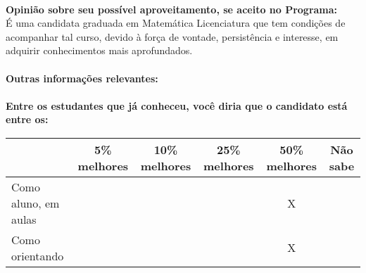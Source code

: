\documentclass[11pt]{article}
\begin{document}
\\
\textbf{Opinião sobre seu possível aproveitamento, se aceito no Programa:}
\\É uma candidata graduada em Matemática Licenciatura que tem condições de acompanhar tal curso, devido à força de vontade, persistência e interesse, em adquirir conhecimentos mais aprofundados.\\ 
\\
\textbf{Outras informações relevantes:} \\
\\[0.3cm]
\textbf{Entre os estudantes que já conheceu, você diria que o candidato está entre os:}
\\
\begin{tabular}{|l|c|c|c|c|c|}
\hline
 & 5\% melhores & 10\% melhores & 25\% melhores & 50\% melhores & Não sabe \\
\hline
Como aluno, em aulas &  &  &  & X & \\
\hline
Como orientando &  &  &  & X & \\
\hline
\end{tabular}
\end{document}
